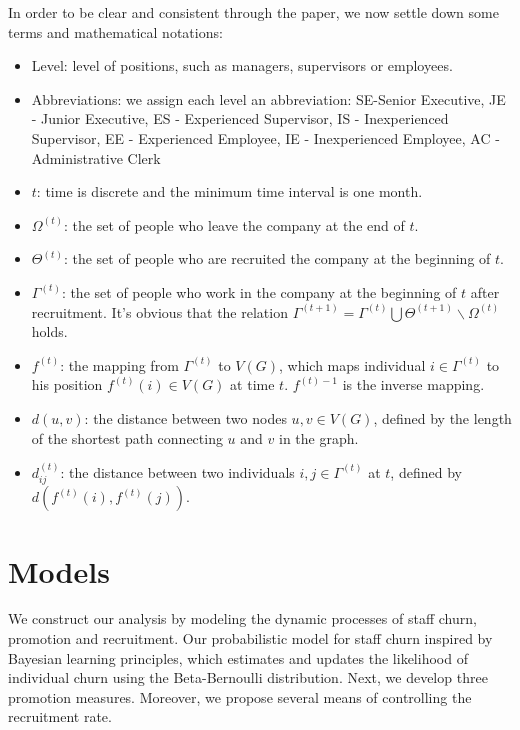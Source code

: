 \documentclass[tcn = 37075, sheet = false, abstract = false]{mcmthesis}
\begin{document}
	In order to be clear and consistent through the paper, we now settle down some terms and mathematical notations:
	
	\begin{itemize}
		\item Level: level of positions, such as managers, supervisors or employees.
		\item Abbreviations: we assign each level an abbreviation: SE-Senior Executive, JE -  Junior Executive, ES - Experienced Supervisor, IS - Inexperienced Supervisor, EE - Experienced Employee, IE - Inexperienced Employee, AC - Administrative Clerk
		\item $t$: time is discrete and the minimum time interval is one month.
		\item $\Omega^{(t)}$: the set of people who leave the company at the end of $t$. \item $\Theta^{(t)}$: the set of people who are recruited the company at the beginning of $t$. 
		\item $\Gamma^{(t)}$: the set of people who work in the company at the beginning of $t$ after recruitment. It's obvious that the relation $\Gamma^{(t+1)}=\Gamma^{(t)}\bigcup \Theta ^{(t+1)} \backslash \Omega^{(t)}$ holds.
		\item $f^{(t)}$: the mapping from $\Gamma^{(t)}$ to $V(G)$, which maps individual $i\in \Gamma^{(t)}$ to his position $f^{(t)}(i) \in V(G)$ at time $t$. $f^{(t)-1}$ is the inverse mapping.
		\item $d(u,v)$: the distance between two nodes $u, v\in V(G)$, defined by the length of the shortest path connecting $u$ and $v$ in the graph.
		\item $d_{ij}^{(t)}$: the distance between two individuals $i, j\in  \Gamma^{(t)}$ at $t$, defined by $d(f^{(t)}(i),f^{(t)}(j))$.
	\end{itemize}
	
	
	\section{Models}
	
	We construct our analysis by modeling the dynamic processes of staff churn, promotion and recruitment. Our probabilistic model for staff churn inspired by Bayesian learning principles, which estimates and updates the likelihood of individual churn using the Beta-Bernoulli distribution. Next, we develop three promotion measures. Moreover, we propose several means of controlling the recruitment rate.
	
\end{document}

